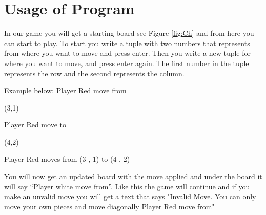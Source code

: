 \documentclass[12pt,a4paper]{article}
\begin{document}
\section{Usage of Program}
In our game you will get a starting board see Figure \ref{fig:Ch} and from here you can start to play. To start you write a tuple with two numbers that represents from where you want to move and press enter. Then you write a new tuple for where you want to move, and press enter again. The first number in the tuple represents the row and the second represents the column.

Example below:
Player Red move from

(3,1)

Player Red move to

(4,2)

Player Red moves from  (3 , 1)  to  (4 , 2)

You will now get an updated board with the move applied and under the board it will say “Player white move from”. Like this the game will continue and if you make an unvalid move you will get a text that says "Invalid Move. You can only move your own pieces and move diagonally
Player Red move from"
\end{document}
